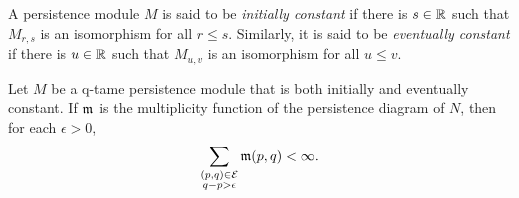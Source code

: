 \begin{defi} \label{d:initially and eventually constant}
	A persistence module $M$ is said to be \emph{initially constant} if there is $s \in \mathbb{R}$ such that $M_{r,s}$ is an isomorphism for all $r \leq s$.
	Similarly, it is said to be \emph{eventually constant} if there is $u \in \mathbb{R}$
	such that $M_{u,v}$ is an isomorphism for all $u \leq v$.
\end{defi}

\begin{thm} \label{t:cap numbers well defined}
	Let $M$ be a q-tame persistence module that is both initially and eventually constant.
	If $\mathfrak{m}$ is the multiplicity function of the persistence diagram of $N$,
	then for each $\epsilon > 0$,
	\begin{equation*}
	\sum_{ \substack{ (p,q) \in \mathcal{E} \\ q-p > \epsilon } } \mathfrak{m} (p,q) < \infty.
	\end{equation*}
\end{thm}

